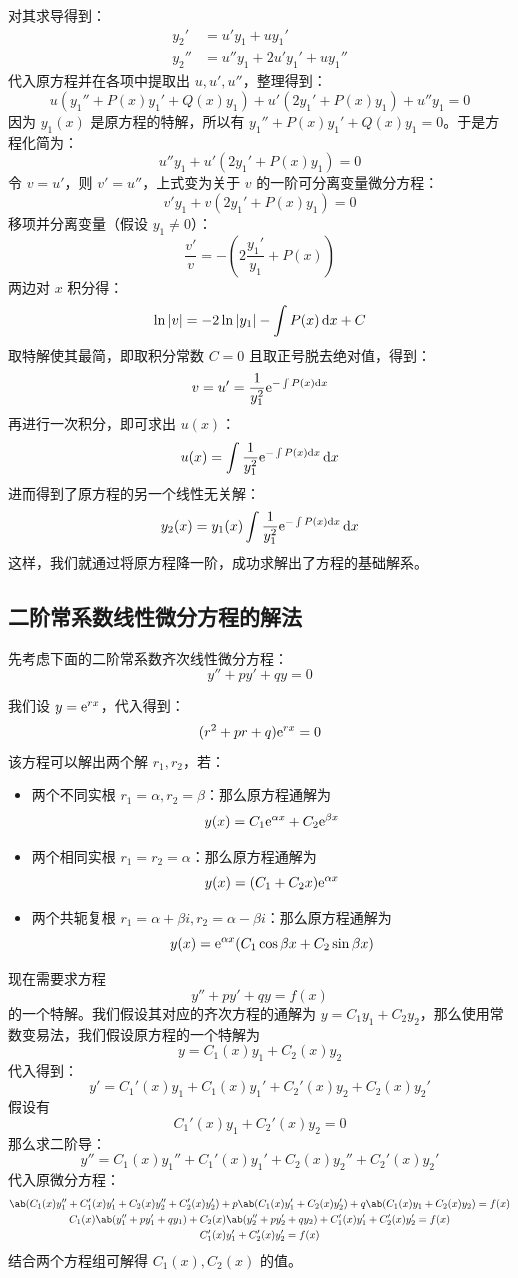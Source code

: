 对其求导得到：
$$
\begin{aligned}
    y_2' & = u' y_1 + u y_1' \\
    y_2'' & = u'' y_1 + 2 u' y_1' + u y_1''
\end{aligned}
$$
代入原方程并在各项中提取出 $u, u', u''$，整理得到：
$$
u(y_1'' + P(x) y_1' + Q(x) y_1) + u'(2y_1' + P(x) y_1) + u'' y_1 = 0
$$
因为 $y_1(x)$ 是原方程的特解，所以有 $y_1'' + P(x) y_1' + Q(x) y_1 = 0$。于是方程化简为：
$$
u'' y_1 + u' (2y_1' + P(x) y_1) = 0
$$
令 $v = u'$，则 $v' = u''$，上式变为关于 $v$ 的一阶可分离变量微分方程：
$$
v' y_1 + v (2y_1' + P(x) y_1) = 0
$$
移项并分离变量（假设 $y_1 \neq 0$）：
$$
\frac{v'}{v} = - \left(2\frac{y_1'}{y_1} + P(x)\right)
$$
两边对 $x$ 积分得：
$$
\ln \abs{v} = -2 \ln \abs{y_1} - \int P(x) \dd{x} + C
$$
取特解使其最简，即取积分常数 $C = 0$ 且取正号脱去绝对值，得到：
$$
v = u' = \frac{1}{y_1^2} \mathrm{e}^{-\int P(x) \dd{x}}
$$
再进行一次积分，即可求出 $u(x)$：
$$
u(x) = \int \frac{1}{y_1^2} \mathrm{e}^{-\int P(x) \dd{x}} \dd{x}
$$
进而得到了原方程的另一个线性无关解：
$$
y_2(x) = y_1(x) \int \frac{1}{y_1^2} \mathrm{e}^{-\int P(x) \dd{x}} \dd{x}
$$
这样，我们就通过将原方程降一阶，成功求解出了方程的基础解系。

\subsection{二阶常系数线性微分方程的解法}

先考虑下面的二阶常系数齐次线性微分方程：
$$
y'' + py' + qy = 0
$$

我们设 $y = \mathrm{e}^{r x}$，代入得到：
$$
(r^2 + p r + q) \mathrm{e}^{r x} = 0
$$
该方程可以解出两个解 $r_1, r_2$，若：
\begin{itemize}
    \item 两个不同实根 $r_1 = \alpha, r_2 = \beta$：那么原方程通解为
    $$
    y(x) = C_1 \mathrm{e}^{\alpha x} + C_2 \mathrm{e}^{\beta x}
    $$
    \item 两个相同实根 $r_1 = r_2 = \alpha$：那么原方程通解为
    $$
    y(x) = (C_1 + C_2 x) \mathrm{e}^{\alpha x}
    $$
    \item 两个共轭复根 $r_1 = \alpha + \beta i, r_2 = \alpha - \beta i$：那么原方程通解为
    $$
    y(x) = \mathrm{e}^{\alpha x} (C_1 \cos \beta x + C_2 \sin \beta x)
    $$
\end{itemize}

现在需要求方程
$$
y'' + p y' + q y = f(x)
$$
的一个特解。我们假设其对应的齐次方程的通解为 $y = C_1 y_1 + C_2 y_2$，那么使用常数变易法，我们假设原方程的一个特解为
$$
y = C_1(x) y_1 + C_2(x) y_2
$$
代入得到：
$$
y' = C_1'(x) y_1 + C_1(x) y_1' + C_2'(x) y_2 + C_2(x) y_2'
$$
假设有
$$
C_1'(x) y_1 + C_2'(x) y_2 = 0
$$
那么求二阶导：
$$
y'' = C_1(x) y_1'' + C_1'(x) y_1' + C_2(x) y_2'' + C_2'(x) y_2'
$$
代入原微分方程：
$$
\begin{gathered}
    \ab(C_1(x) y_1'' + C_1'(x) y_1' + C_2(x) y_2'' + C_2'(x) y_2') + p \ab(C_1(x) y_1' + C_2(x) y_2') + q \ab(C_1(x) y_1 + C_2(x) y_2) = f(x) \\
    C_1(x) \ab(y_1'' + p y_1' + q y_1) + C_2(x) \ab(y_2'' + p y_2' + q y_2) + C_1'(x) y_1' + C_2'(x) y_2' = f(x) \\
    C_1'(x) y_1' + C_2'(x) y_2' = f(x)
\end{gathered}
$$
结合两个方程组可解得 $C_1(x), C_2(x)$ 的值。

